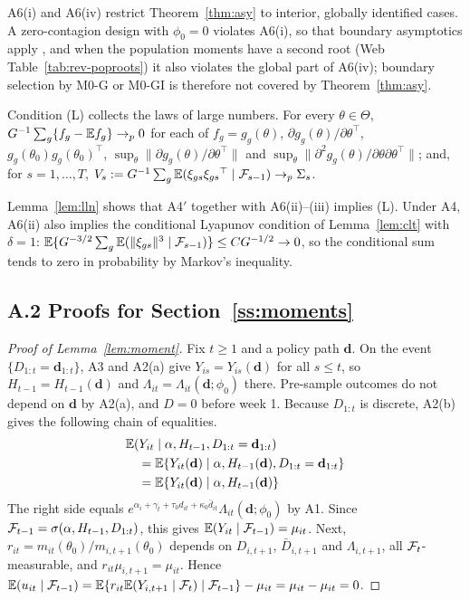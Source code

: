 \noindent A6(i) and A6(iv) restrict Theorem~\ref{thm:asy} to interior, globally identified cases. A
zero-contagion design with $\phi_0=0$ violates A6(i), so that boundary asymptotics apply
\citep{self1987boundary,andrews1999boundary}, and when the population moments have a second
root (Web Table~\ref{tab:rev-poproots}) it also violates the global part of A6(iv); boundary
selection by M0-G or M0-GI is therefore not covered by Theorem~\ref{thm:asy}.

\noindent Condition (L) collects the laws of large numbers. For every $\theta\in\Theta$,
$G^{-1}\sum_g\{f_g-\mathbb{E} f_g\}\to_p0$ for each of $f_g=g_g(\theta)$, $\partial g_g(\theta)/\partial\theta^{\top}$,
$g_g(\theta_0)g_g(\theta_0)^{\top}$, $\sup_\theta\|\partial g_g(\theta)/\partial\theta^{\top}\|$ and
$\sup_\theta\|\partial^2g_g(\theta)/\partial\theta\partial\theta^{\top}\|$; and, for $s=1,\dots,T$,
$V_s:=G^{-1}\sum_g\mathbb{E}(\xi_{gs}\xi_{gs}{}^{\top}\mid\mathcal{F}_{s-1})\to_p\Sigma_s$.

\noindent Lemma~\ref{lem:lln} shows that A4$'$ together with A6(ii)--(iii) implies (L). Under A4,
A6(ii) also implies the conditional Lyapunov condition of Lemma~\ref{lem:clt} with $\delta=1$:
$\mathbb{E}\{G^{-3/2}\sum_g\mathbb{E}(\|\xi_{gs}\|^3\mid\mathcal{F}_{s-1})\}\le CG^{-1/2}\to0$, so the conditional sum tends to
zero in probability by Markov's inequality.

\subsection{A.2 Proofs for Section~\ref{ss:moments}}

\begin{proof}[Proof of Lemma~\ref{lem:moment}]
Fix $t\ge1$ and a policy path $\mathbf d$. On the event $\{D_{1:t}=\mathbf d_{1:t}\}$, A3 and A2(a)
give $Y_{is}=Y_{is}(\mathbf d)$ for all $s\le t$, so $H_{t-1}=H_{t-1}(\mathbf d)$ and
$\Lambda_{it}=\Lambda_{it}(\mathbf d;\phi_0)$ there. Pre-sample outcomes do not depend on
$\mathbf d$ by A2(a), and $D=0$ before week 1. Because $D_{1:t}$ is discrete, A2(b) gives the following chain of equalities.
\begin{align*}
&\mathbb{E}(Y_{it}\mid\alpha,H_{t-1},D_{1:t}=\mathbf d_{1:t})\\
&\quad=\mathbb{E}\{Y_{it}(\mathbf d)\mid\alpha,H_{t-1}(\mathbf d),D_{1:t}=\mathbf d_{1:t}\}\\
&\quad=\mathbb{E}\{Y_{it}(\mathbf d)\mid\alpha,H_{t-1}(\mathbf d)\}
\end{align*}
The right side equals $e^{\alpha_i+\gamma_t+\tau_0d_{it}+\kappa_0\bar d_{it}}\Lambda_{it}(\mathbf d;\phi_0)$
by A1. Since $\mathcal{F}_{t-1}=\sigma(\alpha,H_{t-1},D_{1:t})$, this gives $\mathbb{E}(Y_{it}\mid\mathcal{F}_{t-1})=\mu_{it}$. Next,
$r_{it}=m_{it}(\theta_0)/m_{i,t+1}(\theta_0)$ depends on $D_{i,t+1}$, $\bar D_{i,t+1}$ and
$\Lambda_{i,t+1}$, all $\mathcal{F}_t$-measurable, and $r_{it}\mu_{i,t+1}=\mu_{it}$. Hence
$\mathbb{E}(u_{it}\mid\mathcal{F}_{t-1})=\mathbb{E}\{r_{it}\mathbb{E}(Y_{i,t+1}\mid\mathcal{F}_t)\mid\mathcal{F}_{t-1}\}-\mu_{it}=\mu_{it}-\mu_{it}=0$.
\end{proof}


